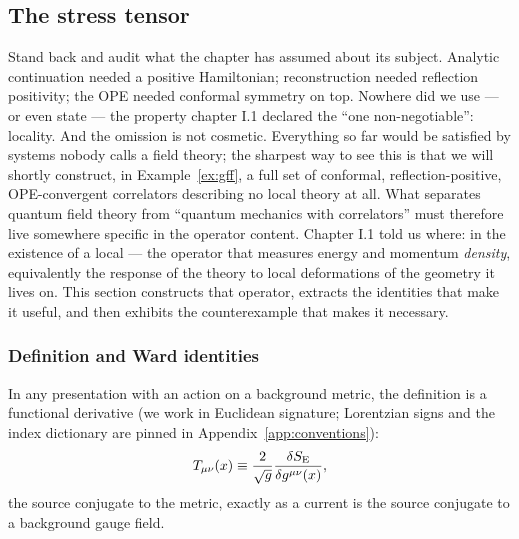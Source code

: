 \subsection{The stress tensor}
\label{sec:stress-tensor}

Stand back and audit what the chapter has assumed about its subject. Analytic
continuation needed a positive Hamiltonian; reconstruction needed reflection
positivity; the OPE needed conformal symmetry on top. Nowhere did we use ---
or even state --- the property chapter I.1 declared the ``one non-negotiable'':
locality. And the omission is not cosmetic. Everything so far would be
satisfied by systems nobody calls a field theory; the sharpest way to see this
is that we will shortly construct, in Example~\ref{ex:gff}, a full set of
conformal, reflection-positive, OPE-convergent correlators describing no local
theory at all. What separates quantum field theory from ``quantum mechanics
with correlators'' must therefore live somewhere specific in the operator
content. Chapter I.1 told us where: in the existence of a local  --- the operator that measures energy and momentum \emph{density},
equivalently the response of the theory to local deformations of the geometry
it lives on. This section constructs that operator, extracts the identities
that make it useful, and then exhibits the counterexample that makes it
necessary.

\subsubsection{Definition and Ward identities}

In any presentation with an action on a background metric, the definition is a
functional derivative (we work in Euclidean signature; Lorentzian signs and
the index dictionary are pinned in Appendix~\ref{app:conventions}):
\begin{equation}
T_{\mu\nu}(x) \equiv \frac{2}{\sqrt{g}}
\frac{\delta S_{\rm E}}{\delta g^{\mu\nu}(x)} ,
\label{eq:stress-def}
\end{equation}
the source conjugate to the metric, exactly as a current is the source
conjugate to a background gauge field.

